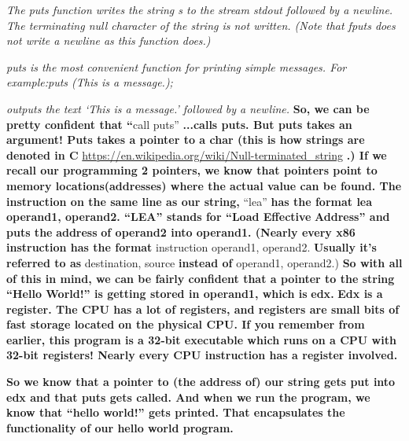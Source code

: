 \documentclass[letterpaper]{article}
\newcommand{\sitfig}[3]{
\begin{figure}[H]
\centering
\makebox[\textwidth][c]{
#2
}
\label{#1}
\end{figure}
}
\newcommand{\sitgfx}[4][scale=1.0]{
\sitfig{#3}{\texttt{[image: \#2]}}{#4}
}
\begin{document}
\textit{The puts function writes the string s to the stream stdout followed by a newline. The terminating null character
of the string is not written. (Note that fputs does not write a newline as this function does.)}

\textit{puts is the most convenient function for printing simple messages. \newline
For example:puts ({\textquotedbl}This is a message.{\textquotedbl});}

\textit{outputs the text `This is a message.' followed by a newline.\newline
\newline
}\textbf{So, we can be pretty confident that ``}call puts'' \textbf{...calls puts. But puts takes an argument! Puts
takes a pointer to a char (this is how strings are denoted in C
}\url{https://en.wikipedia.org/wiki/Null-terminated_string}\textbf{ .) If we recall our programming 2 pointers, we know
that pointers point to memory locations(}\textbf{\textcolor[rgb]{0.21960784,0.4627451,0.11372549}{addresses}}\textbf{)
where the actual value can be found. \newline
The instruction on the same line as our string, }{}``lea''\textbf{ has the format lea operand1, operand2. ``LEA'' stands
for ``Load Effective }\textbf{\textcolor[rgb]{0.21960784,0.4627451,0.11372549}{Address}}\textbf{{}'' and puts the
}\textbf{\textcolor[rgb]{0.21960784,0.4627451,0.11372549}{address}}\textbf{ of operand2 into operand1. (Nearly every
x86 instruction has the format }instruction operand1, operand2. \textbf{Usually it's referred to as }destination,
source\textbf{ instead of }operand1, operand2.)\textbf{  \newline
So with all of this in mind, we can be fairly confident that a pointer to the string ``Hello World!'' is getting stored
in operand1, which is }\textbf{\textcolor[rgb]{0.21960784,0.4627451,0.11372549}{edx}}\textbf{.
}\textbf{\textcolor[rgb]{0.21960784,0.4627451,0.11372549}{Edx }}\textbf{is a
}\textbf{\textcolor[rgb]{0.21960784,0.4627451,0.11372549}{register}}\textbf{. The CPU has a lot of registers, and
registers are small bits of fast storage located on the physical CPU. If you remember from earlier, this program is a
32-bit executable which runs on a CPU with 32-bit registers! Nearly every CPU instruction has a register involved.}

{\centering
  
\sitgfx[width=1.9583in,height=1.8752in]{reversing-img011.png}{fig:unk}{TODO CAPTION}
 \par}
\textbf{So we know that a pointer to (the address of) our string gets put into edx and that puts gets called. And when
we run the program, we know that ``hello world!'' gets printed. That encapsulates the functionality of our hello world
program. }
\end{document}
